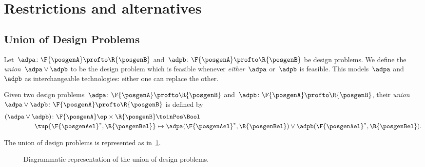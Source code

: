 

\section{Restrictions and alternatives}


\subsection{Union of Design Problems}
Let~$\adpa\colon \F{\posgenA}\profto \R{\posgenB}$ and~$\adpb\colon \F{\posgenA}\profto \R{\posgenB}$ be design problems.
We define the \emph{union}~$\adpa \vee \adpb$ to be the design problem which is feasible whenever \emph{either}~$\adpa$ or~$\adpb$ is feasible.
This models~$\adpa$ and~$\adpb$ as interchangeable technologies: either one can replace the other.

\begin{definition}
    \label{def:union_dp}
    Given two design problems~$\adpa \colon \F{\posgenA} \profto \R{\posgenB}$ and~$\adpb\colon \F{\posgenA} \profto \R{\posgenB}$, their \emph{union}~$\adpa \vee \adpb\colon \F{\posgenA} \profto \R{\posgenB}$ is defined by
    \begin{equation}
        \begin{aligned}
        (\adpa \vee \adpb)
            \colon \F{\posgenA}\op \times \R{\posgenB} & \toinPos \Bool \\
            \tup{\F{\posgenAel}^*, \R{\posgenBel}} & \mapsto \adpa(\F{\posgenAel}^*, \R{\posgenBel}) \vee \adpb(\F{\posgenAel}^*, \R{\posgenBel}).
        \end{aligned}
    \end{equation}
\end{definition}

The union of design problems is represented as in~\cref{fig:uniondp}.

\begin{figure}[h!]
    \begin{center}
    \end{center}
    \caption{Diagrammatic representation of the union of design problems. }
    \label{fig:uniondp}
\end{figure}

